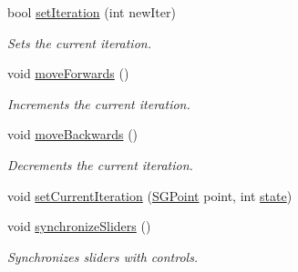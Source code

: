 \begin{DoxyCompactItemize}
\mbox{\label{classSGPlotController_aa77fca25b62a8206d3ddc1fa7cd16eac}} 
bool \hyperlink{classSGPlotController_aa77fca25b62a8206d3ddc1fa7cd16eac}{set\+Iteration} (int new\+Iter)
\begin{DoxyCompactList}\small\item\em Sets the current iteration. \end{DoxyCompactList}\item 
\mbox{\label{classSGPlotController_a45da9096f5457484fb8bc5c63c8b7fc5}} 
void \hyperlink{classSGPlotController_a45da9096f5457484fb8bc5c63c8b7fc5}{move\+Forwards} ()
\begin{DoxyCompactList}\small\item\em Increments the current iteration. \end{DoxyCompactList}\item 
\mbox{\label{classSGPlotController_a918ec5fac2839b4a328289962e0ac441}} 
void \hyperlink{classSGPlotController_a918ec5fac2839b4a328289962e0ac441}{move\+Backwards} ()
\begin{DoxyCompactList}\small\item\em Decrements the current iteration. \end{DoxyCompactList}\item 
void \hyperlink{classSGPlotController_a3b0857d4b4c40bbac853ded334573fa0}{set\+Current\+Iteration} (\hyperlink{classSGPoint}{S\+G\+Point} point, int \hyperlink{classSGPlotController_aaef95a25f39e465b01cc92770d93bd2d}{state})
\item 
void \hyperlink{classSGPlotController_a2d4971bb9f2f6116ce314d146a43bb08}{synchronize\+Sliders} ()
\begin{DoxyCompactList}\small\item\em Synchronizes sliders with controls. \end{DoxyCompactList}\end{DoxyCompactItemize}
